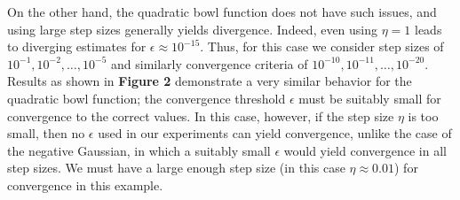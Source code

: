 \documentclass[10pt,psamsfonts]{amsart}
\theoremstyle{definition}
\theoremstyle{remark}
\numberwithin{equation}{section}
\begin{document}
On the other hand, the quadratic bowl function does not have such issues, and using large step sizes generally yields divergence. Indeed, even using $\eta = 1$ leads to diverging estimates for $\epsilon \approx 10^{-15}$. Thus, for this case we consider step sizes of $10^{-1}, 10^{-2}, \dots, 10^{-5}$ and similarly convergence criteria of $10^{-10}, 10^{-11}, \dots, 10^{-20}$. Results as shown in {\bf Figure 2} demonstrate a very similar behavior for the quadratic bowl function; the convergence threshold $\epsilon$ must be suitably small for convergence to the correct values. In this case, however, if the step size $\eta$ is too small, then no $\epsilon$ used in our experiments can yield convergence, unlike the case of the negative Gaussian, in which a suitably small $\epsilon$ would yield convergence in all step sizes. We must have a large enough step size (in this case $\eta \approx 0.01$) for convergence in this example.
\end{document}
